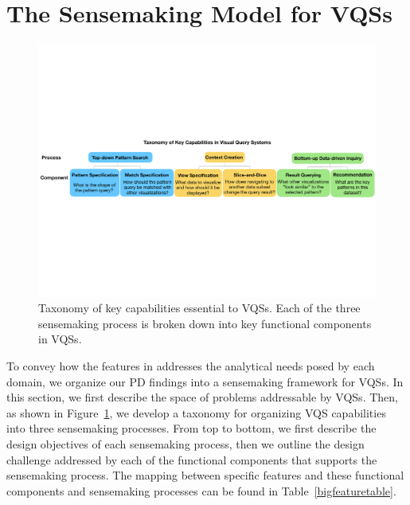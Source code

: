 \section{The Sensemaking Model for VQSs\label{sec:sensemaking}}
\begin{figure}[ht!]
  \centering
  \includegraphics[width=0.9\linewidth]{figures/taxonomy.pdf}
  \caption{Taxonomy of key capabilities essential to VQSs. Each of the three sensemaking process is broken down into key functional components in VQSs. } %
  \label{fig:taxonomy}
  \end{figure}
  To convey how the features in \zvpp addresses the analytical needs posed by each domain, we organize our PD findings into a sensemaking framework for VQSs. In this section, we first describe the space of problems addressable by VQSs. Then, as shown in Figure~\ref{fig:taxonomy}, we develop a taxonomy for organizing VQS capabilities into three sensemaking processes. From top to bottom, we first describe the design objectives of each sensemaking process, then we outline the design challenge addressed by each of the functional components that supports the sensemaking process. The mapping between specific \zvpp features and these functional components and sensemaking processes can be found in Table~\ref{bigfeaturetable}.
